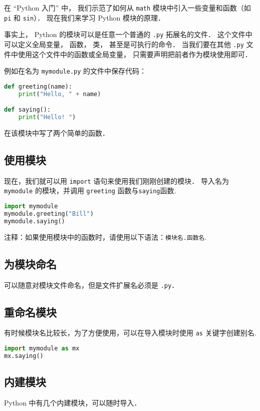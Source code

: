 

在 “Python 入门” 中， 我们示范了如何从 \verb|math| 模块中引入一些变量和函数（如 \verb|pi| 和 \verb|sin|）． 现在我们来学习 Python 模块的原理．

事实上， Python 的模块可以是任意一个普通的 \verb|.py| 拓展名的文件． 这个文件中可以定义全局变量， 函数， 类， 甚至是可执行的命令． 当我们要在其他 \verb|.py| 文件中使用这个文件中的函数或全局变量， 只需要声明把前者作为模块使用即可．

例如在名为 \verb|mymodule.py| 的文件中保存代码：
\begin{lstlisting}[language=python]
def greeting(name):
    print("Hello, " + name)

def saying():
    print("Hello! ")
\end{lstlisting}
在该模块中写了两个简单的函数．

\subsection{使用模块}
现在，我们就可以用 \verb|import| 语句来使用我们刚刚创建的模块． 导入名为 \verb|mymodule| 的模块，并调用 \verb|greeting| 函数与\verb|saying|函数.
\begin{lstlisting}[language=python]
import mymodule
mymodule.greeting("Bill")
mymodule.saying()
\end{lstlisting}
注释：如果使用模块中的函数时，请使用以下语法：\verb|模块名.函数名|.

\subsection{为模块命名}
可以随意对模块文件命名，但是文件扩展名必须是 \verb|.py|．

\subsection{重命名模块}
有时候模块名比较长，为了方便使用，可以在导入模块时使用 \verb|as| 关键字创建别名.
\begin{lstlisting}[language=python]
import mymodule as mx
mx.saying()
\end{lstlisting}

\subsection{内建模块}
Python 中有几个内建模块，可以随时导入．
